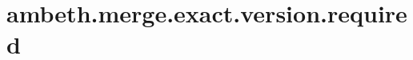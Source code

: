 \section{ambeth.merge.exact.version.required}
\label{configuration:AmbethMergeExactVersionRequired}
\AvailableInJavaAndCsharp{\TODO}